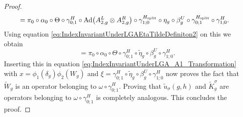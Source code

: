 \documentclass[12pt,a4paper,twoside]{article}
\numberwithin{equation}{section}
\begin{document}
\begin{proof}
\begin{align}
		&=\pi_0\circ\alpha_0\circ\Theta\circ\gamma^{H}_{0;1}\circ\Ad{A_{2,g}^L\otimes A_{2,g}^R}\circ\gamma^{H_\text{split}}_{1;0}\circ\eta_g\circ\beta_g^U\circ\gamma^{H_\text{split}}_{0;1}\circ\gamma^H_{1;0}.
	\end{align}
	Using equation \eqref{eq:IndexInvariantUnderLGAEtaTildeDefiniton2} on this we obtain
	\begin{equation}
		=\pi_0\circ\alpha_0\circ\Theta\circ\gamma^H_{0;1}\circ\tilde{\eta}_g\circ\beta_g^U\circ\gamma^H_{1;0}.
	\end{equation}
	Inserting this in equation \eqref{eq:IndexInvariantUnderLGA_A1_Transformation} with $x=\phi_1(\delta_g)\phi_2(W_g)$ and $\xi=\gamma^H_{0;1}\circ\tilde{\eta}_g\circ\beta_g^U\circ\gamma^H_{1;0}$ now proves the fact that $\tilde{W}_g$ is an operator belonging to $\omega\circ\gamma^H_{0;1}$. Proving that $\tilde u_\sigma(g,h)$ and $\tilde{K}_g^\sigma$ are operators belonging to $\omega\circ\gamma_{0;1}^H$ is completely analogous. This concludes the proof.
\end{proof}
\end{document}
